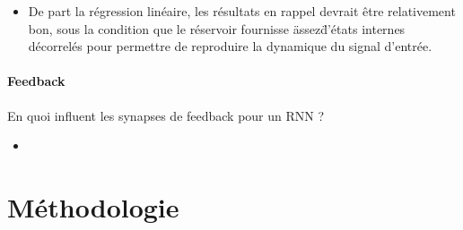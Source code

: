 \documentclass[12pt]{article}
\begin{document}
\begin{itemize}
\item De part la régression linéaire, les résultats en rappel devrait être relativement bon, sous la condition que le réservoir fournisse \"assez\" d'états internes décorrelés pour permettre de reproduire la dynamique du signal d'entrée.
\end{itemize}

\paragraph{Feedback}
En quoi influent les synapses de feedback pour un RNN ?

\begin{itemize}
\item
\end{itemize}


\section{Méthodologie}

\subsection{} 



\end{document}

